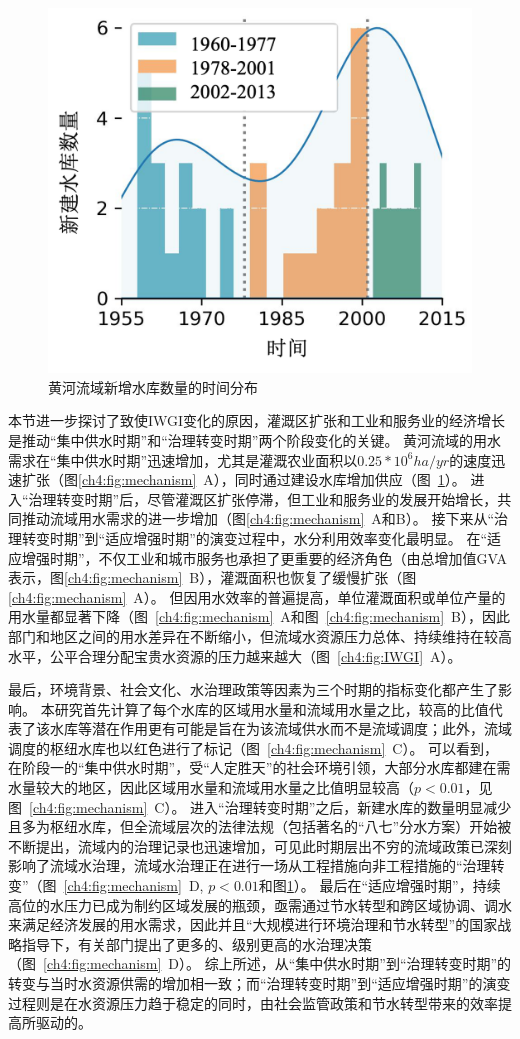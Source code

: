 \begin{figure}[tb]
    \centering
    \includegraphics[width=0.6\linewidth]{img/ch4/ch4_reservoirs.png}
    \caption{黄河流域新增水库数量的时间分布}\label{ch4:fig:reservoirs}
\end{figure}


本节进一步探讨了致使IWGI变化的原因，灌溉区扩张和工业和服务业的经济增长是推动“集中供水时期”和“治理转变时期”两个阶段变化的关键。
黄河流域的用水需求在“集中供水时期”迅速增加，尤其是灌溉农业面积以$0.25*10^6 ha/yr$的速度迅速扩张（图\ref{ch4:fig:mechanism}~A），同时通过建设水库增加供应（图~\ref{ch4:fig:reservoirs}）。
进入“治理转变时期”后，尽管灌溉区扩张停滞，但工业和服务业的发展开始增长，共同推动流域用水需求的进一步增加（图\ref{ch4:fig:mechanism}~A和B）。
接下来从“治理转变时期”到“适应增强时期”的演变过程中，水分利用效率变化最明显。
在“适应增强时期”，不仅工业和城市服务也承担了更重要的经济角色（由总增加值GVA表示，图\ref{ch4:fig:mechanism}~B），灌溉面积也恢复了缓慢扩张（图\ref{ch4:fig:mechanism}~A）。
但因用水效率的普遍提高，单位灌溉面积或单位产量的用水量都显著下降（图~\ref{ch4:fig:mechanism}~A和图~\ref{ch4:fig:mechanism}~B），因此部门和地区之间的用水差异在不断缩小，但流域水资源压力总体、持续维持在较高水平，公平合理分配宝贵水资源的压力越来越大（图~\ref{ch4:fig:IWGI}~A）。

最后，环境背景、社会文化、水治理政策等因素为三个时期的指标变化都产生了影响。
本研究首先计算了每个水库的区域用水量和流域用水量之比，较高的比值代表了该水库等潜在作用更有可能是旨在为该流域供水而不是流域调度；此外，流域调度的枢纽水库也以红色进行了标记（图~\ref{ch4:fig:mechanism}~C）。
可以看到，在阶段一的“集中供水时期”，受“人定胜天”的社会环境引领，大部分水库都建在需水量较大的地区，因此区域用水量和流域用水量之比值明显较高（$p<0.01$，见图~\ref{ch4:fig:mechanism}~C）。
进入“治理转变时期”之后，新建水库的数量明显减少且多为枢纽水库，但全流域层次的法律法规（包括著名的“八七”分水方案）开始被不断提出，流域内的治理记录也迅速增加，可见此时期层出不穷的流域政策已深刻影响了流域水治理，流域水治理正在进行一场从工程措施向非工程措施的“治理转变”（图~\ref{ch4:fig:mechanism}~D, $p<0.01$和图\ref{ch4:fig:reservoirs}）。
最后在“适应增强时期”，持续高位的水压力已成为制约区域发展的瓶颈，亟需通过节水转型和跨区域协调、调水来满足经济发展的用水需求，因此并且“大规模进行环境治理和节水转型”的国家战略指导下，有关部门提出了更多的、级别更高的水治理决策（图~\ref{ch4:fig:mechanism}~D）。
综上所述，从“集中供水时期”到“治理转变时期”的转变与当时水资源供需的增加相一致；而“治理转变时期”到“适应增强时期”的演变过程则是在水资源压力趋于稳定的同时，由社会监管政策和节水转型带来的效率提高所驱动的。